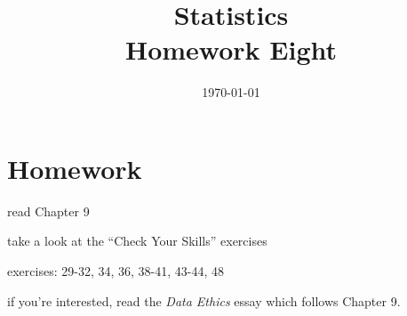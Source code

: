 \documentclass[letterpaper, landscape]{exam}
\title{Statistics \\ Homework Eight}
\date{\today}
\author{}
\begin{document}
  \maketitle

  \ifprintanswers
  \else
    \section{Homework}
    \begin{itemize*}
      \item read Chapter 9 
      \item take a look at the ``Check Your Skills'' exercises
      \item exercises: 29-32, 34, 36, 38-41, 43-44, 48
      \item if you're interested, read the {\em Data Ethics} essay which follows
        Chapter 9.
    \end{itemize*}
  \fi
\end{document}
